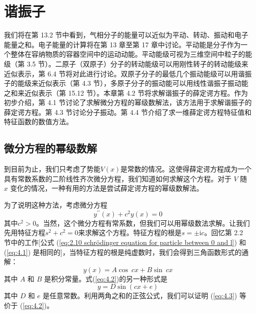\chapter{谐振子}
\label{chap:4}
    我们将在第 13.2 节中看到，气相分子的能量可以近似为平动、转动、振动和电子能量之和。电子能量的计算将在第 13 章至第 17 章中讨论。平动能是分子作为一个整体在容纳物质的容器空间中的运动动能。平动能级可视为三维空间中粒子的能级（第 3.5 节）。二原子（双原子）分子的转动能级可以用刚性转子的转动能级来近似表示，第 6.4 节将对此进行讨论。双原子分子的最低几个振动能级可以用谐振子的能级来近似表示（第 4.3 节），多原子分子的振动能可以用线性谐振子振动能之和来近似表示（第 15.12 节）。本章第 4.2 节将求解谐振子的薛定谔方程。作为初步介绍，第 4.1 节讨论了求解微分方程的幂级数解法，该方法用于求解谐振子的薛定谔方程。第 4.3 节讨论分子振动。第 4.4 节介绍了求一维薛定谔方程特征值和特征函数的数值方法。
\section{微分方程的幂级数解}
\label{sec:4.1 Power-Series Solutions of Differential Equations}
    到目前为止，我们只考虑了势能$V\left(x\right)$是常数的情况。这使得薛定谔方程成为一个具有常数系数的二阶线性齐次微分方程，我们知道如何求解这个方程。对于 $V$ 随 $x$ 变化的情况，一种有用的方法是尝试薛定谔方程的幂级数解法。

    为了说明这种方法，考虑微分方程
    \begin{equation}
        y^{\prime\prime}\left(x\right) + c^2 y\left(x\right) = 0
        \label{eq:4.1}
    \end{equation}
    其中$c^2>0$。当然，这个微分方程有常系数，但我们可以用幂级数法求解。让我们先用特征方程$s^2+c^2=0$来求解这个方程。特征方程的根是$s=\pm \mathrm{i}c$。回忆第 2.2 节中的工作[公式 (\ref{eq:2.10 schrödinger equation for particle between 0 and l}) 和 (\ref{eq:4.1}) 是相同的]，当特征方程的根是纯虚数时，我们会得到三角函数形式的通解：
    \begin{equation}
        y\left(x\right) = A \cos\: cx + B \sin\: cx
        \label{eq:4.2}
    \end{equation}
    其中 $A$ 和 $B$ 是积分常量。式(\ref{eq:4.2})的另一种形式是
    \begin{equation}
        y = D \sin\left(cx+e\right)
        \label{eq:4.3}
    \end{equation}
    其中 $D$ 和 $e$ 是任意常数。利用两角之和的正弦公式，我们可以证明 (\ref{eq:4.3}) 等价于 (\ref{eq:4.2})。

